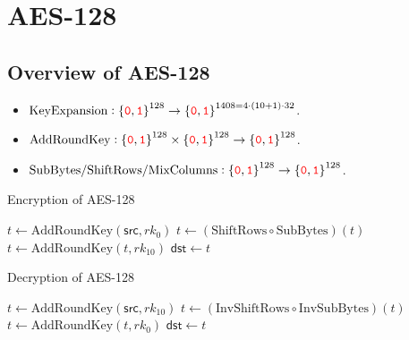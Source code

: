 \chapter{AES-128}

\section{Overview of AES-128}

\begin{itemize}
	\item $\text{KeyExpansion}:\set{\textcolor{red}{\texttt{0}},\textcolor{red}{\texttt{1}}}^{128}\to\set{\textcolor{red}{\texttt{0}},\textcolor{red}{\texttt{1}}}^{1408=4\cdot(10+1)\cdot32}$.
	\item $\text{AddRoundKey}:\set{\textcolor{red}{\texttt{0}},\textcolor{red}{\texttt{1}}}^{128}\times\set{\textcolor{red}{\texttt{0}},\textcolor{red}{\texttt{1}}}^{128}\to\set{\textcolor{red}{\texttt{0}},\textcolor{red}{\texttt{1}}}^{128}$.
	\item $\text{SubBytes/ShiftRows/MixColumns}:\set{\textcolor{red}{\texttt{0}},\textcolor{red}{\texttt{1}}}^{128}\to\set{\textcolor{red}{\texttt{0}},\textcolor{red}{\texttt{1}}}^{128}$.
\end{itemize}

\begin{algorithm}[H]
	\caption{Encryption of AES-128}
	
	\BlankLine
	$t \leftarrow \text{AddRoundKey}(\mathsf{src}, rk_0)$\;
	$t \leftarrow (\text{ShiftRows}\circ\text{SubBytes})(t)$\;
	$t \leftarrow \text{AddRoundKey}(t, rk_{10})$\;
	$\mathsf{dst} \leftarrow t$\;
	\;
\end{algorithm}

\begin{algorithm}[H]
	\caption{Decryption of AES-128}
	
	\BlankLine
	$t \leftarrow \text{AddRoundKey}(\mathsf{src}, rk_{10})$\;
	$t \leftarrow (\text{InvShiftRows}\circ\text{InvSubBytes})(t)$\;
	$t \leftarrow \text{AddRoundKey}(t, rk_{0})$\;
	$\mathsf{dst} \leftarrow t$\;
	\;
\end{algorithm}

